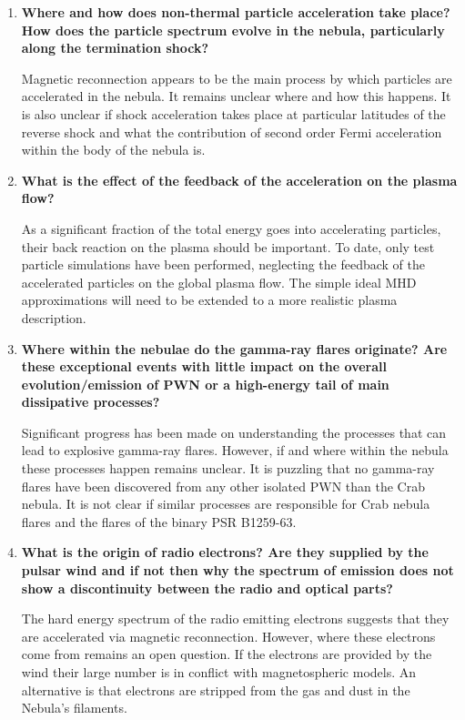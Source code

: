 \begin{enumerate}

\item \textbf{Where and how does non-thermal particle acceleration take place? How does the particle spectrum evolve in the nebula, particularly along the termination shock? }

Magnetic reconnection appears to be the main process by which particles are accelerated in the nebula. It remains unclear where and how this happens. It is also unclear if shock acceleration takes place at particular latitudes of the reverse shock and what the contribution of second order Fermi acceleration within the body of the nebula is.

\item \textbf{What is the effect of the feedback of the acceleration on the plasma flow?}

As a significant fraction of the total energy goes into accelerating particles, their back reaction on the plasma should be important. To date, only test particle simulations have been performed, neglecting the feedback of the accelerated particles on the global plasma flow. The simple ideal MHD approximations will need to be extended to a more realistic plasma description.

\item \textbf{Where within the nebulae do the gamma-ray flares originate? Are these exceptional events with little impact on the overall evolution/emission of PWN or a high-energy tail of main dissipative processes?  }

Significant progress has been made on understanding the processes that can lead to explosive gamma-ray flares. However, if and where within the nebula these processes happen remains unclear. It is puzzling that no gamma-ray flares have been discovered from any other isolated PWN than the Crab nebula. It is not clear if similar processes are responsible for Crab nebula flares and the flares of the binary PSR B1259-63.

\item \textbf{What is the origin of radio electrons? Are they supplied by the pulsar wind and if not then why the spectrum of emission does not show a discontinuity between the radio and optical parts? }

The hard energy spectrum of the radio emitting electrons suggests that they are accelerated via magnetic reconnection. However, where these electrons come from remains an open question. If the electrons are provided by the wind their large number is in conflict with magnetospheric models. An alternative is that electrons are stripped from the gas and dust in the Nebula's filaments.


\end{enumerate}
